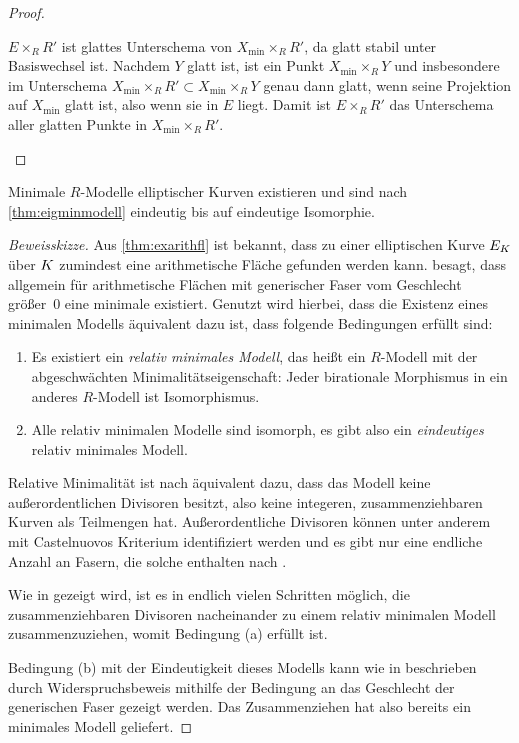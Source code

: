 \begin{Satz}
\begin{proof}
\begin{enumerate}[label=(\roman*)]
      $E\times_R R'$ ist glattes Unterschema von
      $X_{\text{min}}\times_R R'$, da glatt stabil unter Basiswechsel
      ist. Nachdem $Y$ glatt ist, ist ein Punkt 
      $X_{\text{min}}\times_R Y$ und insbesondere im Unterschema
      ${X_{\text{min}}\times_R R'}\subset {X_{\text{min}}\times_R Y}$
      genau dann glatt, wenn seine Projektion auf $X_{\text{min}}$
      glatt ist, also wenn sie in $E$ liegt. Damit ist $E\times_R R'$
      das Unterschema aller glatten Punkte in
      ${X_{\text{min}}\times_R R'}$.
    \end{enumerate}
  \end{proof}
\end{Satz}

\begin{Satz}\label{thm:exminmodell}
  Minimale $R$-Modelle elliptischer Kurven existieren und sind nach
  \ref{thm:eigminmodell} eindeutig bis auf eindeutige Isomorphie.
  \begin{proof}[Beweisskizze]
    Aus \ref{thm:exarithfl} ist bekannt, dass zu einer elliptischen
    Kurve $E_{K}$ über $K$ zumindest eine arithmetische Fläche
    gefunden werden kann.
    \cite[Theorem 9.3.21]{liu} besagt, dass allgemein für
    arithmetische Flächen mit generischer Faser vom Geschlecht
    größer~0 eine minimale existiert.
    Genutzt wird hierbei, dass die Existenz eines minimalen Modells
    äquivalent dazu ist, dass folgende Bedingungen erfüllt sind:
    \begin{enumerate}[label=(\alph*)]
    \item Es existiert ein \emph{relativ minimales Modell}, das heißt
      ein $R$-Modell mit der abgeschwächten Minimalitätseigenschaft:
      Jeder birationale Morphismus in ein anderes $R$-Modell ist
      Isomorphismus.
    \item Alle relativ minimalen Modelle sind isomorph, es gibt also
      ein \emph{eindeutiges} relativ minimales Modell.
    \end{enumerate}
    Relative Minimalität ist nach \cite[Theorem 9.2.2]{liu} äquivalent
    dazu, dass das Modell keine außerordentlichen Divisoren besitzt,
    also keine integeren, zusammenziehbaren Kurven als Teilmengen
    hat.
    Außerordentliche Divisoren können unter anderem mit Castelnuovos
    Kriterium \cite[Theorem 9.3.8]{liu} identifiziert werden und es
    gibt nur eine endliche Anzahl an Fasern, die solche enthalten nach
    \cite[Lemma 9.3.17]{liu}.

    Wie in \cite[Proposition 9.3.19]{liu} gezeigt wird, ist es in
    endlich vielen Schritten möglich, die zusammenziehbaren Divisoren
    nacheinander zu einem relativ minimalen Modell zusammenzuziehen,
    womit Bedingung (a) erfüllt ist.

    Bedingung (b) mit der Eindeutigkeit dieses Modells kann wie in
    \cite[Theorem 9.3.21]{liu} beschrieben durch Widerspruchsbeweis
    mithilfe der Bedingung an das Geschlecht der generischen Faser
    gezeigt werden.
    Das Zusammenziehen hat also bereits ein minimales Modell geliefert.
  \end{proof}
\end{Satz}

